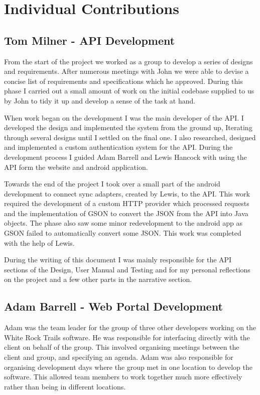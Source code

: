 \documentclass[11pt,a4paper]{report}
\begin{document}
\section{Individual Contributions}
\label{sec:individual-contributions}

\subsection{Tom Milner - API Development}
From the start of the project we worked as a group to develop a series of designs and requirements. After numerous meetings with John we were able to devise a concise list of requirements and specifications which he approved. During this phase I carried out a small amount of work on the initial codebase supplied to us by John to tidy it up and develop a sense of the task at hand. 

When work began on the development I was the main developer of the API. I developed the design and implemented the system from the ground up, Iterating through several designs until I settled on the final one. I also researched, designed and implemented a custom authentication system for the API. During the development process I guided Adam Barrell and Lewis Hancock with using the API form the website and android application. 

Towards the end of the project I took over a small part of the android development to connect sync adapters, created by Lewis, to the API. This work required the development of a custom HTTP provider which processed requests and the implementation of GSON to convert the JSON from the API into Java objects. The phase also saw some minor redevelopment to the android app as GSON failed to automatically convert some JSON. This work was completed with the help of Lewis. 

During the writing of this document I was mainly responsible for the API sections of the Design, User Manual and Testing and for my personal reflections on the project and a few other parts in the narrative section. 

\subsection{Adam Barrell - Web Portal Development}
Adam was the team leader for the group of three other developers working on the White Rock Trails software. He was responsible for interfacing directly with the client on behalf of the group. This involved organising meetings between the client and group, and specifying an agenda. Adam was also responsible for organising development days where the group met in one location to develop the software. This allowed team members to work together much more effectively rather than being in different locations.
\end{document}
